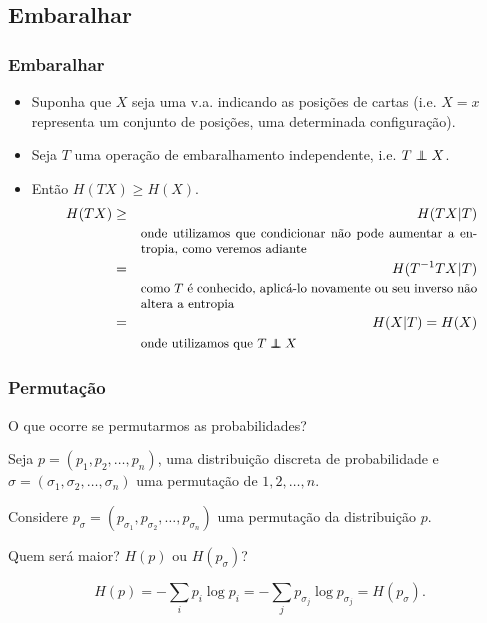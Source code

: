 \subsection{Embaralhar}
\begin{frame}%
  \frametitle{Embaralhar}
  \begin{itemize}
  \item Suponha que $X$ seja uma v.a. indicando as posições de cartas (i.e. $X=x$ representa
  um conjunto de posições, uma determinada configuração).
  \item Seja $T$ uma operação de embaralhamento independente, i.e. $T \independent X$.
  \item Então $H(TX) \geq H(X)$.
  \begin{eqnarray}
  H(TX) &\geq& H(TX|T) \nonumber \\
        && \parbox[c]{0.7\linewidth}{\small onde utilizamos que condicionar não pode aumentar a entropia, como veremos adiante} \nonumber \\
        &=& H(T^{-1}TX|T) \nonumber \\
        && \parbox[c]{0.7\linewidth}{\small como $T$ é conhecido, aplicá-lo novamente ou seu inverso não altera a entropia} \nonumber \\
        &=& H(X|T) = H(X) \\
        && \parbox[c]{0.7\linewidth}{\small onde utilizamos que $T \independent X$} \nonumber
  \end{eqnarray}

  \end{itemize}
\end{frame} 

\begin{frame}%
  \frametitle{Permutação}
  O que ocorre se permutarmos as probabilidades?
  
  Seja $p=(p_1, p_2, \ldots, p_n)$, uma distribuição discreta de probabilidade e
  $\sigma = (\sigma_1, \sigma_2, \ldots, \sigma_n)$ uma permutação de $1, 2, \ldots, n$.
  
  Considere $p_\sigma = (p_{\sigma_1}, p_{\sigma_2}, \ldots, p_{\sigma_n} )$ uma permutação
  da distribuição $p$.

  Quem será maior? $H(p)$ ou $H(p_\sigma)$?

  \begin{equation}
  H(p) = - \sum_i p_i \log p_i = - \sum_j p_{\sigma_j} \log p_{\sigma_j} = H(p_\sigma)  .
  \end{equation}
\end{frame}

